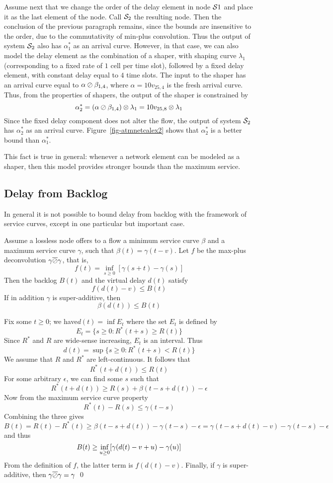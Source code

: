 Assume next that we change the order of the delay element in node
$\mathcal S1$ and place it as the last element of the node. Call
$\mathcal S_2$ the resulting node. Then the conclusion of the previous
paragraph remains, since the bounds are insensitive to the order,
due to the commutativity of min-plus convolution. Thus the output
of system $\mathcal S_2$ also has $\alpha^*_1$ as an arrival curve.
However, in that case, we can also model the delay element as the
combination of a shaper, with shaping curve $\lambda_1$
(corresponding to a fixed rate of $1$ cell per time slot),
followed by a fixed delay element, with constant delay equal to
$4$ time slots. The input to the shaper has an arrival curve equal
to $\alpha \oslash \beta_{1,4}$, where $\alpha = 10 v_{25,4}$ is the
fresh arrival curve. Thus, from the properties of shapers, the
output of the shaper is constrained by
 $$\alpha^*_2 = ( \alpha \oslash
\beta_{1,4}) \otimes \lambda_1= 10 v_{25,8}\otimes \lambda_1$$
 Since the
fixed delay component does not alter the flow, the output of
system $\mathcal S_2$ has $\alpha^*_2$ as an arrival curve.
Figure~\ref{fig-atmnetcalex2} shows that $\alpha^*_2$ is a better
bound than $\alpha^*_1$.

This fact is true in general: whenever a network element can be
modeled as a shaper, then this model provides stronger bounds than
the maximum service.

\subsection{Delay from Backlog}
In general it is not possible to bound delay from backlog with the
framework of service curves, except in one particular but
important case.
\begin{theorem}
Assume a lossless node offers to a flow a minimum service curve
$\beta$ and a maximum service curve $\gamma$, such that
$\beta(t)=\gamma(t-v)$. Let $f$ be the max-plus deconvolution
$\gamma \overline{\oslash} \gamma$, that is,
$$f(t)=\inf_{s \geq 0} [\gamma(s+t)-\gamma(s)]$$
Then the backlog
$B(t)$ and the virtual delay $d(t)$ satisfy
 $$f(d(t)-v) \leq  B(t)$$
 If in addition $\gamma$ is super-additive, then
 $$\beta(d(t)) \leq  B(t)$$
\end{theorem}
\pr
Fix some $t \geq 0$; we have$d(t)=\inf E_t$ where the set $E_t$ is
defined by
$$
 E_t= \{s\geq 0: R^*(t+s) \geq R(t)\}
$$
Since $R^*$ and $R$ are wide-sense increasing, $E_t$ is an
interval. Thus
 $$d(t)=\sup\{s\geq 0: R^*(t+s) < R(t)\}$$
We assume that $R$ and $R^*$ are left-continuous. It follows that
$$
 R^*(t+d(t)) \leq R(t)
$$
For some arbitrary $\epsilon$, we can find some $s$ such that
 $$
 R^*(t + d(t)) \geq R(s) + \beta(t-s+ d(t)) - \epsilon
 $$
 Now from the maximum service curve property
 $$
 R^*(t)-R(s) \leq \gamma (t-s)
 $$
Combining the three gives
$$
  B(t)= R(t) - R^*(t) \geq \beta(t-s+ d(t))  - \gamma (t-s) -
  \epsilon = \gamma(t-s+ d(t)-v)  - \gamma (t-s) -
  \epsilon
$$
and thus
\begin{equation}\mylabel{eq-minmaxetdel}
  B(t) \geq \inf_{u \geq 0} [ \gamma(d(t)-v+u)  - \gamma (u)]
\end{equation}
 From the definition of $f$, the latter term is $f(d(t)-v)$.
 Finally, if $\gamma$ is super-additive, then $\gamma \overline{\oslash} \gamma=
 \gamma$
 \qed

